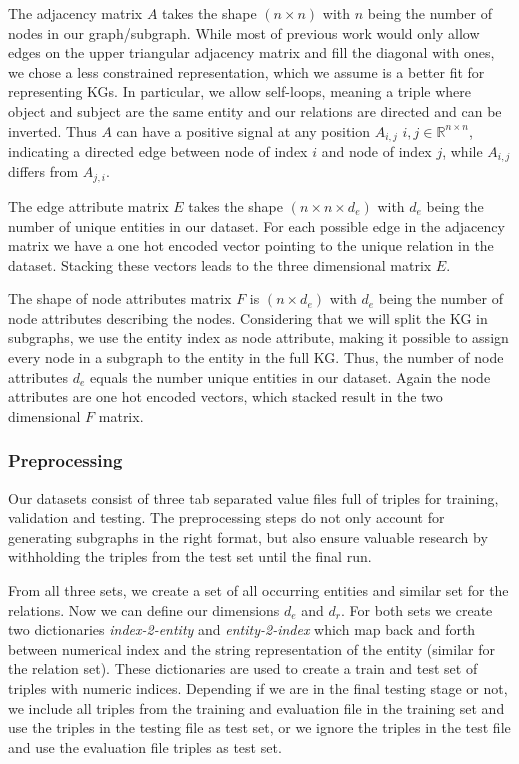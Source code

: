 The adjacency matrix $A$ takes the shape $(n\times n)$ with $n$ being the number of nodes in our graph/subgraph. While most of previous work would only allow edges on the upper triangular adjacency matrix and fill the diagonal with ones, we chose a less constrained representation, which we assume is a better fit for representing KGs. In particular, we allow self-loops, meaning a triple where object and subject are the same entity and our relations are directed and can be inverted. Thus $A$ can have a positive signal at any position $A_{i,j}$  $i,j \in \mathbb{R}^{n \times n}$, indicating a directed edge between node of index $i$ and node of index $j$, while $A_{i,j}$ differs from $A_{j,i}$.

The edge attribute matrix $E$ takes the shape $(n\times n\times d_e)$ with $d_e$ being the number of unique entities in our dataset. For each possible edge in the adjacency matrix we have a one hot encoded vector pointing to the unique relation in the dataset. Stacking these vectors leads to the three dimensional matrix $E$.

The shape of node attributes matrix $F$ is $(n\times d_e)$ with $d_e$ being the number of node attributes describing the nodes. Considering that we will split the KG in subgraphs, we use the entity index as node attribute, making it possible to assign every node in a subgraph to the entity in the full KG. Thus, the number of node attributes $d_e$ equals the number unique entities in our dataset. Again the node attributes are one hot encoded vectors, which stacked result in the two dimensional $F$ matrix.


\subsubsection{Preprocessing}
Our datasets consist of three tab separated value files full of triples for training, validation and testing. The preprocessing steps do not only account for generating subgraphs in the right format, but also ensure valuable research by withholding the triples from the test set until the final run.

From all three sets, we create a set of all occurring entities and similar set for the relations. Now we can define our dimensions $d_e$ and $d_r$. For both sets we create two dictionaries \textit{index-2-entity} and \textit{entity-2-index}  which map back and forth between numerical index and the string representation of the entity (similar for the relation set). These dictionaries are used to create a train and test set of triples with numeric indices. Depending if we are in the final testing stage or not, we include all triples from the training and evaluation file in the training set and use the triples in the testing file as test set, or we ignore the triples in the test file and use the evaluation file triples as test set.

